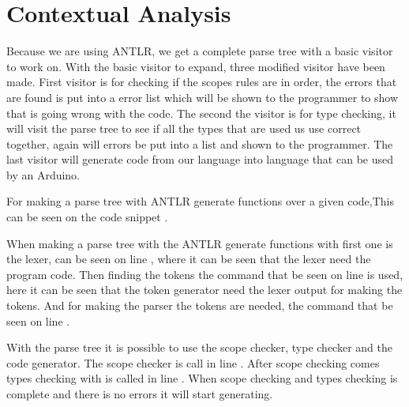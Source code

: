 \section{Contextual Analysis}
Because we are using ANTLR, we get a complete parse tree with a basic visitor to work on. With the basic visitor to expand, three modified visitor have been made. First visitor is for checking if the scopes rules are in order, the errors that are found is put into a error list which will be shown to the programmer to show that is going wrong with the code. The second the visitor is for type checking, it will visit the parse tree to see if all the types that are used us use correct together, again will errors be put into a list and shown to the programmer. The last visitor will generate code from our language into language that can be used by an Arduino.

For making a parse tree with ANTLR generate functions over a given code,This can be seen on the code snippet .

When making a parse tree with the ANTLR generate functions with first one is the lexer, can be seen on line , where it can be seen that the lexer need the program code. Then finding the tokens the command that be seen on line  is used, here it can be seen that the token generator need the lexer output for making the tokens. And for making the parser the tokens are needed, the command that be seen on line .

With the parse tree it is possible to use the scope checker, type checker and the code generator. The scope checker is call in line . After scope checking comes types checking with is called in line . When scope checking and types checking is complete and there is no errors it will start generating.